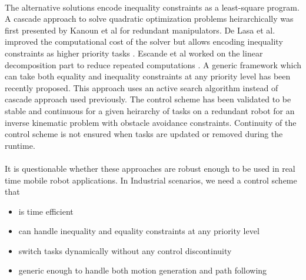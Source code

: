 \paragraph{}  
The alternative solutions encode inequality constraints as a least-square program. A cascade approach to solve quadratic optimization problems heirarchically was first presented by Kanoun et al for redundant manipulators\cite{kanoun2011kinematic}. De Lasa et al. improved the computational cost of the solver but allows encoding inequality constraints as higher priority tasks \cite{de2010feature}. Escande et al worked on the linear decomposition part to reduce repeated computations \cite{escande2010fast}. A generic framework which can take both equality and inequality constraints at any priority level has been recently proposed. This approach uses an active search algorithm instead of cascade approach used previously. The control scheme has been validated to be stable and continuous for a given heirarchy of tasks on a redundant robot for an inverse kinematic problem with obstacle avoidance constraints. Continuity of the control scheme is not ensured when tasks are updated or removed during the runtime. 

\paragraph{}
It is questionable whether these approaches are robust enough to be used in real time mobile robot applications.
In Industrial scenarios, we need a control scheme that 
\begin{itemize}
\item  is time efficient
\item  can handle inequality and equality constraints at any priority level  
\item  switch tasks dynamically without any control discontinuity
\item  generic enough to handle both motion generation and path following
\end{itemize}

 

